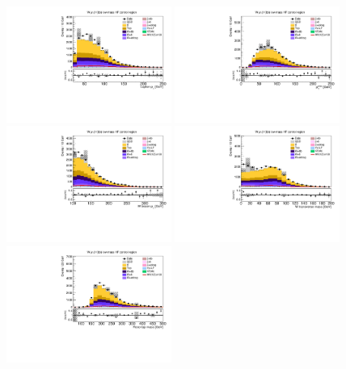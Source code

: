 \begin{figure}[tbp]
  \begin{center}
    \includegraphics[width=0.48\textwidth]{figures/wlnhbb2016/resolved/WmnWHHeavyFlavorCRLowMass_lepton1Pt.pdf}
    \includegraphics[width=0.48\textwidth]{figures/wlnhbb2016/resolved/WmnWHHeavyFlavorCRLowMass_pfmet.pdf}
    \includegraphics[width=0.48\textwidth]{figures/wlnhbb2016/resolved/WmnWHHeavyFlavorCRLowMass_WpT.pdf}
    \includegraphics[width=0.48\textwidth]{figures/wlnhbb2016/resolved/WmnWHHeavyFlavorCRLowMass_mTW.pdf}
    \includegraphics[width=0.48\textwidth]{figures/wlnhbb2016/resolved/WmnWHHeavyFlavorCRLowMass_topMassLep1Met.pdf}

\end{center}
\end{figure}
